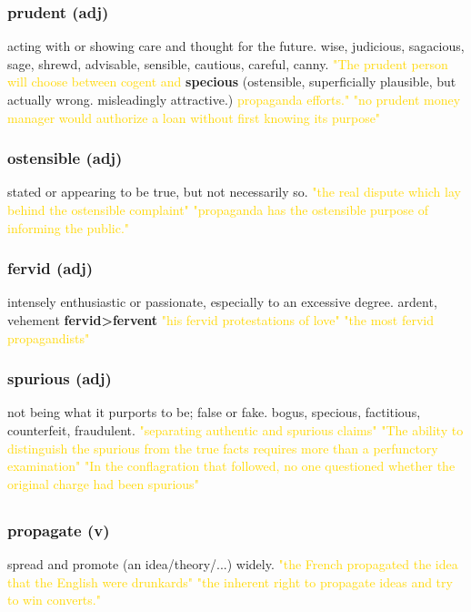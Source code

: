 \documentclass{proc}
\begin{document}
	\subsubsection{\textcolor{brickred}{prudent} (adj)}
	acting with or showing care and thought for the future. wise,
	judicious,
	sagacious,
	sage,
	shrewd,
	advisable,
	sensible,
	cautious,
	careful,
	canny.
	\textcolor{gold}{"The prudent person will choose between cogent  and }\textbf{specious} (ostensible, superficially plausible, but actually wrong. misleadingly attractive.) \textcolor{gold}{propaganda efforts."
	"no prudent money manager would authorize a loan without first knowing its purpose"}
	
	\subsubsection{\textcolor{brickred}{ostensible} (adj)}
	stated or appearing to be true, but not necessarily so.
	\textcolor{gold}{"the real dispute which lay behind the ostensible complaint"
	"propaganda has the ostensible purpose of  informing the public."}
	
	\subsubsection{\textcolor{brickred}{fervid} (adj)}
	intensely enthusiastic or passionate, especially to an excessive degree. ardent, vehement \textbf{fervid\textgreater fervent}
	\textcolor{gold}{"his fervid protestations of love"
	"the most fervid propagandists"}
	
	\subsubsection{\textcolor{brickred}{spurious} (adj)}
	not being what it purports to be; false or fake. bogus, specious,
	factitious,
	counterfeit,
	fraudulent.
	\textcolor{gold}{"separating authentic and spurious claims"
	"The ability to distinguish the spurious from the true facts requires more than a perfunctory examination"
	"In the conflagration that followed, no one questioned whether the original charge had been spurious"}
	
	\newpage
	\subsection{}
	\subsubsection{\textcolor{brickred}{propagate} (v)}
	spread and promote (an idea/theory/...) widely.
	\textcolor{gold}{"the French propagated the idea that the English were drunkards"
	"the  inherent right to propagate ideas and try  to  win converts."}
	
\end{document}
